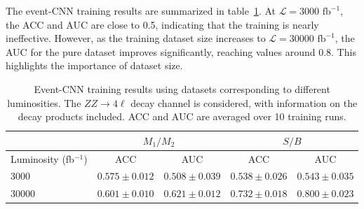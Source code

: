 \documentclass[12pt]{article}
\begin{document}
        The event-CNN training results are summarized in table~\ref{tab:CWoLa_event_CNN_training_results_jet_tagging_ZZ4l_L_3000_30000}. At $\mathcal{L} = \text{3000 fb}^{-1}$, the ACC and AUC are close to 0.5, indicating that the training is nearly ineffective. However, as the training dataset size increases to $\mathcal{L} = \text{30000 fb}^{-1}$, the AUC for the pure dataset improves significantly, reaching values around 0.8. This highlights the importance of dataset size.
        \begin{table}[htpb]
            \centering
            \caption{Event-CNN training results using datasets corresponding to different luminosities. The $ZZ \to 4\ell$ decay channel is considered, with information on the decay products included. ACC and AUC are averaged over 10 training runs.}
            \label{tab:CWoLa_event_CNN_training_results_jet_tagging_ZZ4l_L_3000_30000}
            \begin{tabular}{l|cc|cc}
                                        & \multicolumn{2}{c|}{$M_1 / M_2$}      & \multicolumn{2}{c}{$S / B$}           \\ \hline
                Luminosity (fb$^{-1}$)  & ACC               & AUC               & ACC               & AUC               \\ \hline
                3000                    & $0.575 \pm 0.012$ & $0.508 \pm 0.039$ & $0.538 \pm 0.026$ & $0.543 \pm 0.035$ \\
                30000                   & $0.601 \pm 0.010$ & $0.621 \pm 0.012$ & $0.732 \pm 0.018$ & $0.800 \pm 0.023$
            \end{tabular}
        \end{table}
\end{document}
